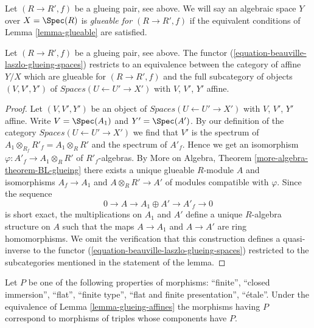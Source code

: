 \noindent
Let $(R \to R', f)$ be a glueing pair, see above.
We will say an algebraic space $Y$ over $X = \Spec(R)$
is {\it glueable for $(R \to R', f)$}
if the equivalent conditions of Lemma \ref{lemma-glueable}
are satisfied.

\begin{lemma}
\label{lemma-glueing-affines}
Let $(R \to R', f)$ be a glueing pair, see above.
The functor (\ref{equation-beauville-laszlo-glueing-spaces})
restricts to an equivalence between the category of affine
$Y/X$ which are glueable for $(R \to R', f)$ and the
full subcategory of objects $(V, V', Y')$ of
$\textit{Spaces}(U \leftarrow U' \to X')$
with $V$, $V'$, $Y'$ affine.
\end{lemma}

\begin{proof}
Let $(V, V', Y')$ be an object of
$\textit{Spaces}(U \leftarrow U' \to X')$
with $V$, $V'$, $Y'$ affine.
Write $V = \Spec(A_1)$ and $Y' = \Spec(A')$. By our definition of the
category $\textit{Spaces}(U \leftarrow U' \to X')$ we find that
$V'$ is the spectrum of $A_1 \otimes_{R_f} R'_f = A_1 \otimes_R R'$
and the spectrum of $A'_f$. Hence we get an isomorphism
$\varphi : A'_f \to A_1 \otimes_R R'$ of $R'_f$-algebras.
By More on Algebra, Theorem \ref{more-algebra-theorem-BL-glueing}
there exists a unique glueable $R$-module $A$ and isomorphisms
$A_f \to A_1$ and $A \otimes_R R' \to A'$ of modules compatible with
$\varphi$. Since the sequence
$$
0 \to A \to A_1 \oplus A' \to A'_f \to 0
$$
is short exact, the multiplications on $A_1$ and $A'$ define
a unique $R$-algebra structure on $A$ such that the maps $A \to A_1$
and $A \to A'$ are ring homomorphisms. We omit the verification
that this construction defines a quasi-inverse to the functor
(\ref{equation-beauville-laszlo-glueing-spaces})
restricted to the subcategories mentioned in the statement of the lemma.
\end{proof}

\begin{lemma}
\label{lemma-glueing-affines-etale}
Let $P$ be one of the following properties of morphisms:
``finite'', ``closed immersion'', ``flat'', ``finite type'',
``flat and finite presentation'', ``\'etale''.
Under the equivalence of Lemma \ref{lemma-glueing-affines}
the morphisms having $P$ correspond to morphisms of triples
whose components have $P$.
\end{lemma}

